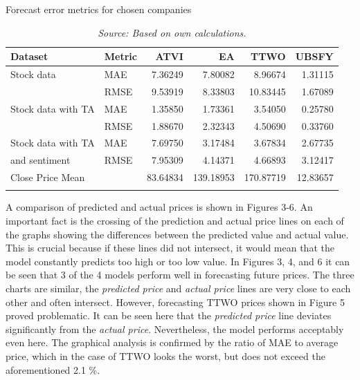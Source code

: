 \documentclass[review]{elsarticle} %
\begin{document}
\begin{table}[H]
\centering
\caption{Forecast error metrics for chosen companies}
\begin{tabular}{llrrrr}
\toprule
 Dataset & Metric &          ATVI &           EA &         TTWO &        UBSFY \\
\midrule
Stock data& MAE              &   7.36249 &    7.80082 &    8.96674 &  1.31115 \\
&RMSE             &   9.53919 &    8.33803 &    10.83445 &   1.67089 \\
Stock data with TA& MAE              &   1.35850 &    1.73361 &    3.54050 &   0.25780 \\
&RMSE             &   1.88670 &    2.32343 &    4.50690 &   0.33760 \\
Stock data with TA& MAE              &   7.69750 &    3.17484 &    3.67834 &   2.67735 \\
and sentiment& RMSE              &   7.95309 &    4.14371 &    4.66893 &   3.12417 \\
\midrule
Close Price Mean & &  83.64834 &  139.18953 &  170.87719 &  12.83657 \\


&               &    &     &    &    \\
\bottomrule
\end{tabular}
\caption*{\textit{Source: Based on own calculations.}}
\end{table}

A comparison of predicted and actual prices is shown in Figures 3-6. An important fact is the crossing of the prediction and actual price lines on each of the graphs showing the differences between the predicted value and actual value. This is crucial because if these lines did not intersect, it would mean that the model constantly predicts too high or too low value. In Figures 3, 4, and 6 it can be seen that 3 of the 4 models perform well in forecasting future prices. The three charts are similar, the \textit{predicted price} and \textit{actual price} lines are very close to each other and often intersect. However, forecasting TTWO prices shown in Figure 5 proved problematic. It can be seen here that the \textit{predicted price} line deviates significantly from the \textit{actual price}. Nevertheless, the model performs acceptably even here. The graphical analysis is confirmed by the ratio of MAE to average price, which in the case of TTWO looks the worst, but does not exceed the aforementioned 2.1 \%.
\\
\end{document}

